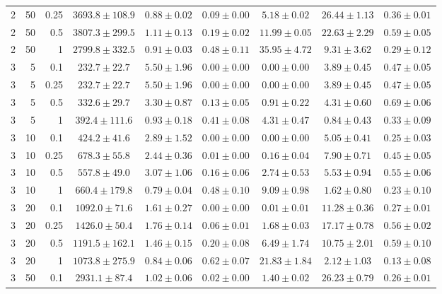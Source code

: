 \begin{table}[htbp]
\begin{tabular}{@{}rrrcccccc@{}}
2 & 50 & 0.25 & $3693.8 \pm 108.9$ & $0.88 \pm 0.02$ & $0.09 \pm 0.00$ & $5.18 \pm 0.02$ & $26.44 \pm 1.13$ & $0.36 \pm 0.01$ \\
2 & 50 & 0.5 & $3807.3 \pm 299.5$ & $1.11 \pm 0.13$ & $0.19 \pm 0.02$ & $11.99 \pm 0.05$ & $22.63 \pm 2.29$ & $0.59 \pm 0.05$ \\
2 & 50 & 1 & $2799.8 \pm 332.5$ & $0.91 \pm 0.03$ & $0.48 \pm 0.11$ & $35.95 \pm 4.72$ & $9.31 \pm 3.62$ & $0.29 \pm 0.12$ \\
\midrule
3 & 5 & 0.1 & $232.7 \pm 22.7$ & $5.50 \pm 1.96$ & $0.00 \pm 0.00$ & $0.00 \pm 0.00$ & $3.89 \pm 0.45$ & $0.47 \pm 0.05$ \\
3 & 5 & 0.25 & $232.7 \pm 22.7$ & $5.50 \pm 1.96$ & $0.00 \pm 0.00$ & $0.00 \pm 0.00$ & $3.89 \pm 0.45$ & $0.47 \pm 0.05$ \\
3 & 5 & 0.5 & $332.6 \pm 29.7$ & $3.30 \pm 0.87$ & $0.13 \pm 0.05$ & $0.91 \pm 0.22$ & $4.31 \pm 0.60$ & $0.69 \pm 0.06$ \\
3 & 5 & 1 & $392.4 \pm 111.6$ & $0.93 \pm 0.18$ & $0.41 \pm 0.08$ & $4.31 \pm 0.47$ & $0.84 \pm 0.43$ & $0.33 \pm 0.09$ \\
3 & 10 & 0.1 & $424.2 \pm 41.6$ & $2.89 \pm 1.52$ & $0.00 \pm 0.00$ & $0.00 \pm 0.00$ & $5.05 \pm 0.41$ & $0.25 \pm 0.03$ \\
3 & 10 & 0.25 & $678.3 \pm 55.8$ & $2.44 \pm 0.36$ & $0.01 \pm 0.00$ & $0.16 \pm 0.04$ & $7.90 \pm 0.71$ & $0.45 \pm 0.05$ \\
3 & 10 & 0.5 & $557.8 \pm 49.0$ & $3.07 \pm 1.06$ & $0.16 \pm 0.06$ & $2.74 \pm 0.53$ & $5.53 \pm 0.94$ & $0.55 \pm 0.06$ \\
3 & 10 & 1 & $660.4 \pm 179.8$ & $0.79 \pm 0.04$ & $0.48 \pm 0.10$ & $9.09 \pm 0.98$ & $1.62 \pm 0.80$ & $0.23 \pm 0.10$ \\
3 & 20 & 0.1 & $1092.0 \pm 71.6$ & $1.61 \pm 0.27$ & $0.00 \pm 0.00$ & $0.01 \pm 0.01$ & $11.28 \pm 0.36$ & $0.27 \pm 0.01$ \\
3 & 20 & 0.25 & $1426.0 \pm 50.4$ & $1.76 \pm 0.14$ & $0.06 \pm 0.01$ & $1.68 \pm 0.03$ & $17.17 \pm 0.78$ & $0.56 \pm 0.02$ \\
3 & 20 & 0.5 & $1191.5 \pm 162.1$ & $1.46 \pm 0.15$ & $0.20 \pm 0.08$ & $6.49 \pm 1.74$ & $10.75 \pm 2.01$ & $0.59 \pm 0.10$ \\
3 & 20 & 1 & $1073.8 \pm 275.9$ & $0.84 \pm 0.06$ & $0.62 \pm 0.07$ & $21.83 \pm 1.84$ & $2.12 \pm 1.03$ & $0.13 \pm 0.08$ \\
3 & 50 & 0.1 & $2931.1 \pm 87.4$ & $1.02 \pm 0.06$ & $0.02 \pm 0.00$ & $1.40 \pm 0.02$ & $26.23 \pm 0.79$ & $0.26 \pm 0.01$ \\

\end{tabular}
\end{table}
